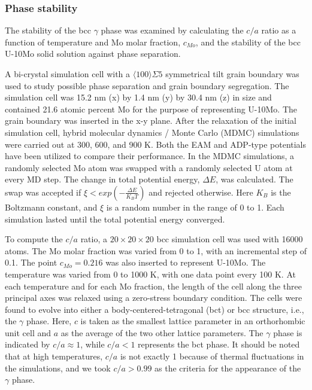 \documentclass[review]{elsarticle}
\begin{document}
\subsubsection{Phase stability}
The stability of the bcc $\gamma$ phase was examined by calculating the $c/a$ ratio as a function of temperature and Mo molar fraction, $c_{Mo}$, and the stability of the bcc U-10Mo solid solution against phase separation.


A bi-crystal simulation cell with a $\langle 100 \rangle \Sigma5$ symmetrical tilt grain boundary was used to study possible phase separation and grain boundary segregation. The simulation cell was 15.2 nm (x) by 1.4 nm (y) by 30.4 nm (z) in size and contained 21.6 atomic percent Mo for the purpose of representing U-10Mo. The grain boundary was inserted in the x-y plane. After the relaxation of the initial simulation cell, hybrid molecular dynamics / Monte Carlo (MDMC) simulations were carried out at 300, 600, and 900 K. Both the EAM and ADP-type potentials have been utilized to compare their performance. In the MDMC simulations, a randomly selected Mo atom was swapped with a randomly selected U atom at every MD step. The change in total potential energy, $\Delta E$, was calculated. The swap was accepted if $\xi<exp(-\frac{\Delta E}{K_BT})$ and rejected otherwise. Here $K_B$ is the Boltzmann constant, and $\xi$ is a random number in the range of 0 to 1. Each simulation lasted until the total potential energy converged. 


To compute the $c/a$ ratio, a $20\times20\times20$ bcc simulation cell was used with 16000 atoms. The Mo molar fraction was varied from 0 to 1, with an incremental step of 0.1. The point $c_{Mo}=0.216$ was also inserted to represent U-10Mo. The temperature was varied from 0 to 1000 K, with one data point every 100 K. At each temperature and for each Mo fraction, the length of the cell along the three principal axes was relaxed using a zero-stress boundary condition. The cells were found to evolve into either a body-centered-tetragonal (bct) or bcc structure, i.e., the $\gamma$ phase. Here, $c$ is taken as the smallest lattice parameter in an orthorhombic unit cell and $a$ as the average of the two other lattice parameters. The $\gamma$ phase is indicated by $c/a{\approx}1$, while $c/a<1$ represents the bct phase. It should be noted that at high temperatures, $c/a$ is not exactly 1 because of thermal fluctuations in the simulations, and we took $c/a>0.99$ as the criteria for the appearance of the $\gamma$ phase. 
\end{document}
